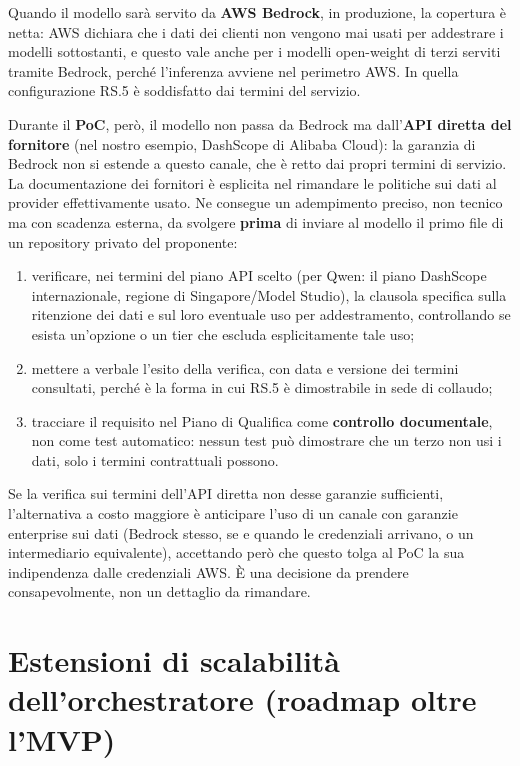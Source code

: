 \documentclass[11pt,a4paper]{article}
\begin{document}
Quando il modello sarà servito da \textbf{AWS Bedrock}, in produzione, la copertura è netta: AWS dichiara che i dati dei clienti non vengono mai usati per addestrare i modelli sottostanti, e questo vale anche per i modelli open-weight di terzi serviti tramite Bedrock, perché l'inferenza avviene nel perimetro AWS. In quella configurazione RS.5 è soddisfatto dai termini del servizio.

Durante il \textbf{PoC}, però, il modello non passa da Bedrock ma dall'\textbf{API diretta del fornitore} (nel nostro esempio, DashScope di Alibaba Cloud): la garanzia di Bedrock non si estende a questo canale, che è retto dai propri termini di servizio. La documentazione dei fornitori è esplicita nel rimandare le politiche sui dati al provider effettivamente usato. Ne consegue un adempimento preciso, non tecnico ma con scadenza esterna, da svolgere \textbf{prima} di inviare al modello il primo file di un repository privato del proponente:
\begin{enumerate}
  \item verificare, nei termini del piano API scelto (per Qwen: il piano DashScope internazionale, regione di Singapore/Model Studio), la clausola specifica sulla ritenzione dei dati e sul loro eventuale uso per addestramento, controllando se esista un'opzione o un tier che escluda esplicitamente tale uso;
  \item mettere a verbale l'esito della verifica, con data e versione dei termini consultati, perché è la forma in cui RS.5 è dimostrabile in sede di collaudo;
  \item tracciare il requisito nel Piano di Qualifica come \textbf{controllo documentale}, non come test automatico: nessun test può dimostrare che un terzo non usi i dati, solo i termini contrattuali possono.
\end{enumerate}
Se la verifica sui termini dell'API diretta non desse garanzie sufficienti, l'alternativa a costo maggiore è anticipare l'uso di un canale con garanzie enterprise sui dati (Bedrock stesso, se e quando le credenziali arrivano, o un intermediario equivalente), accettando però che questo tolga al PoC la sua indipendenza dalle credenziali AWS. È una decisione da prendere consapevolmente, non un dettaglio da rimandare.

\section{Estensioni di scalabilità dell'orchestratore (roadmap oltre l'MVP)}
\label{sec:orchestratore-produzione}
\end{document}
